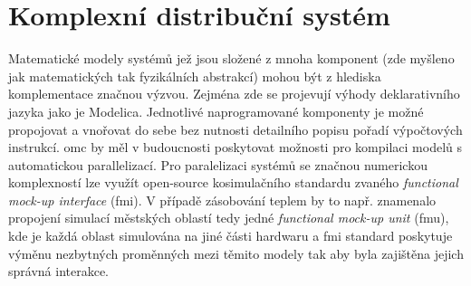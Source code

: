 \section{Komplexní distribuční systém}
\label{sec:Complex_distr_sys}
Matematické modely systémů jež jsou složené z mnoha komponent (zde myšleno jak
matematických tak fyzikálních abstrakcí) mohou být z hlediska komplementace
značnou výzvou. Zejména zde se projevují výhody deklarativního jazyka jako je
Modelica. Jednotlivé naprogramované komponenty je možné propojovat a vnořovat
do sebe bez nutnosti detailního popisu pořadí výpočtových instrukcí.
\acrshort{omc} by měl v budoucnosti poskytovat možnosti pro kompilaci modelů s
automatickou parallelizací. Pro paralelizaci systémů se značnou numerickou
komplexností lze využít open-source kosimulačního standardu zvaného
\textit{functional mock-up interface} (\acrshort{fmi}). V případě zásobování
teplem by to např. znamenalo propojení simulací městských oblastí tedy jedné
\textit{functional mock-up unit} (\acrshort{fmu}), kde je každá oblast
simulována na jiné části hardwaru a  \acrshort{fmi} standard poskytuje výměnu
nezbytných proměnných mezi těmito modely tak aby byla zajištěna jejich správná
interakce.

